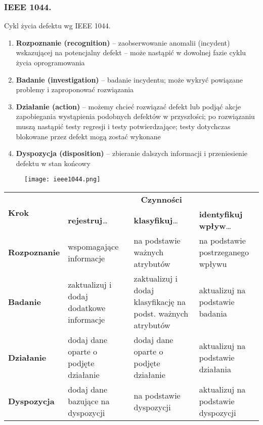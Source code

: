 \documentclass[../main.tex]{subfiles}
\begin{document}
    \subsubsection{IEEE 1044.}
    Cykl życia defektu wg IEEE 1044.
    \begin{enumerate}
        \item \textbf{Rozpoznanie (recognition)} – zaobserwowanie anomalii (incydent) wskazującej na potencjalny defekt – może nastąpić w dowolnej fazie cyklu życia oprogramowania
        \item \textbf{Badanie (investigation)} – badanie incydentu; może wykryć powiązane problemy i zaproponować rozwiązania
        \item \textbf{Działanie (action)} – możemy chcieć rozwiązać defekt lub podjąć akcje zapobiegania wystąpienia podobnych defektów w przyszłości; po rozwiązaniu muszą nastąpić testy regresji i testy potwierdzające; testy dotychczas blokowane przez defekt mogą zostać wykonane
        \item \textbf{Dyspozycja (disposition)} – zbieranie dalszych informacji i przeniesienie defektu w stan końcowy
    \end{enumerate}

    \begin{figure}[H]
        \texttt{[image: ieee1044.png]}
    \end{figure}


    \begin{table}[H]
        \begin{center}
            \begin{tabular}{ | p{3cm} | p{4cm} | p{4cm} | p{4cm} |}
                \hline
                \multirow{2}{*}{\textbf{Krok}} & \multicolumn{3}{c|}{\textbf{Czynności}}\\
                \cline{2-4}
                \multirow{2}{*}{} & \textbf{rejestruj}\ldots & \textbf{klasyfikuj}\ldots & \textbf{identyfikuj wpływ}\ldots\\
                \hline
                \textbf{Rozpoznanie }& wspomagające informacje
                & na podstawie ważnych atrybutów
                & na podstawie postrzeganego wpływu\\
                \hline
                \textbf{Badanie}
                & zaktualizuj i dodaj dodatkowe informacje
                & zaktualizuj i dodaj klasyfikację na podst. ważnych atrybutów
                & aktualizuj na podstawie badania\\
                \hline
                \textbf{Działanie}
                & dodaj dane oparte o podjęte działanie
                & dodaj dane oparte o podjęte działanie
                & aktualizuj na podstawie działania\\
                \hline
                \textbf{Dyspozycja}
                & dodaj dane bazujące na dyspozycji
                & na podstawie dyspozycji
                & aktualizuj na podstawie dyspozycji\\
                \hline
            \end{tabular}
        \end{center}
    \end{table}
\end{document}
